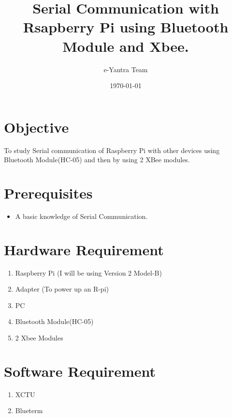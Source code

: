 \documentclass[11pt,a4paper]{article}
\title{Serial Communication with Rsapberry Pi using Bluetooth Module and Xbee.}
\author{e-Yantra Team}
\date{\today}
\begin{document}
	\maketitle
	\newpage
	\tableofcontents
	\newpage
	\section{Objective}
	To study Serial communication of Raspberry Pi with other devices using Bluetooth Module(HC-05) and then by using 2 XBee modules.
	\section{Prerequisites}
	\begin{itemize}
		\item A basic knowledge of Serial Communication.
	\end{itemize}
	\section{Hardware Requirement}
	\begin{enumerate}
		\item Raspberry Pi (I will be using Version 2 Model-B)
		\item Adapter (To power up an R-pi)
		\item PC 
		\item Bluetooth Module(HC-05)
		\item 2 Xbee Modules
	\end{enumerate}
	\section{Software Requirement}
	\begin{enumerate}
		\item XCTU 
		\item Blueterm		
	\end{enumerate}
	\newpage
\end{document}

